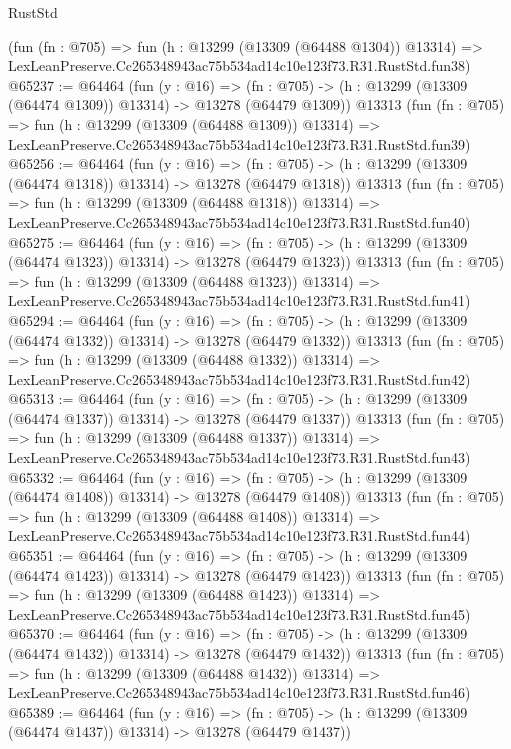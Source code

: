 \begin{lexlean}{RustStd}
\begin{coremodule}
    (fun (fn : @705) =>
    fun (h : @13299 (@13309 (@64488 @1304)) @13314) =>
    LexLeanPreserve.Cc265348943ac75b534ad14c10e123f73.R31.RustStd.fun38)
@65237 := @64464
    (fun (y : @16) =>
    (fn : @705) -> (h : @13299 (@13309 (@64474 @1309)) @13314) -> @13278 (@64479 @1309))
    @13313
    (fun (fn : @705) =>
    fun (h : @13299 (@13309 (@64488 @1309)) @13314) =>
    LexLeanPreserve.Cc265348943ac75b534ad14c10e123f73.R31.RustStd.fun39)
@65256 := @64464
    (fun (y : @16) =>
    (fn : @705) -> (h : @13299 (@13309 (@64474 @1318)) @13314) -> @13278 (@64479 @1318))
    @13313
    (fun (fn : @705) =>
    fun (h : @13299 (@13309 (@64488 @1318)) @13314) =>
    LexLeanPreserve.Cc265348943ac75b534ad14c10e123f73.R31.RustStd.fun40)
@65275 := @64464
    (fun (y : @16) =>
    (fn : @705) -> (h : @13299 (@13309 (@64474 @1323)) @13314) -> @13278 (@64479 @1323))
    @13313
    (fun (fn : @705) =>
    fun (h : @13299 (@13309 (@64488 @1323)) @13314) =>
    LexLeanPreserve.Cc265348943ac75b534ad14c10e123f73.R31.RustStd.fun41)
@65294 := @64464
    (fun (y : @16) =>
    (fn : @705) -> (h : @13299 (@13309 (@64474 @1332)) @13314) -> @13278 (@64479 @1332))
    @13313
    (fun (fn : @705) =>
    fun (h : @13299 (@13309 (@64488 @1332)) @13314) =>
    LexLeanPreserve.Cc265348943ac75b534ad14c10e123f73.R31.RustStd.fun42)
@65313 := @64464
    (fun (y : @16) =>
    (fn : @705) -> (h : @13299 (@13309 (@64474 @1337)) @13314) -> @13278 (@64479 @1337))
    @13313
    (fun (fn : @705) =>
    fun (h : @13299 (@13309 (@64488 @1337)) @13314) =>
    LexLeanPreserve.Cc265348943ac75b534ad14c10e123f73.R31.RustStd.fun43)
@65332 := @64464
    (fun (y : @16) =>
    (fn : @705) -> (h : @13299 (@13309 (@64474 @1408)) @13314) -> @13278 (@64479 @1408))
    @13313
    (fun (fn : @705) =>
    fun (h : @13299 (@13309 (@64488 @1408)) @13314) =>
    LexLeanPreserve.Cc265348943ac75b534ad14c10e123f73.R31.RustStd.fun44)
@65351 := @64464
    (fun (y : @16) =>
    (fn : @705) -> (h : @13299 (@13309 (@64474 @1423)) @13314) -> @13278 (@64479 @1423))
    @13313
    (fun (fn : @705) =>
    fun (h : @13299 (@13309 (@64488 @1423)) @13314) =>
    LexLeanPreserve.Cc265348943ac75b534ad14c10e123f73.R31.RustStd.fun45)
@65370 := @64464
    (fun (y : @16) =>
    (fn : @705) -> (h : @13299 (@13309 (@64474 @1432)) @13314) -> @13278 (@64479 @1432))
    @13313
    (fun (fn : @705) =>
    fun (h : @13299 (@13309 (@64488 @1432)) @13314) =>
    LexLeanPreserve.Cc265348943ac75b534ad14c10e123f73.R31.RustStd.fun46)
@65389 := @64464
    (fun (y : @16) =>
    (fn : @705) -> (h : @13299 (@13309 (@64474 @1437)) @13314) -> @13278 (@64479 @1437))

\end{coremodule}
\end{lexlean}
